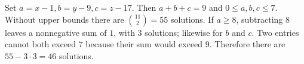 Set $a=x-1,b=y-9,c=z-17$. Then $a+b+c=9$ and $0\le a,b,c\le7$. Without upper bounds there are $\binom{11}2=55$ solutions. If $a\ge8$, subtracting $8$ leaves a nonnegative sum of $1$, with $3$ solutions; likewise for $b$ and $c$. Two entries cannot both exceed $7$ because their sum would exceed $9$. Therefore there are $55-3\cdot3=\boxed{46}$ solutions.
